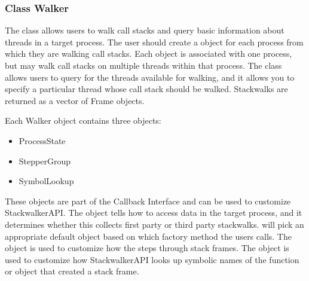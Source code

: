 \subsubsection{Class Walker}
\label{subsec:walker}

The  class allows users to walk call stacks and query basic information
about threads in a target process. The user should create a  object for
each process from which they are walking call stacks. Each  object is
associated with one process, but may walk call stacks on multiple threads within
that process. The  class allows users to query for the threads available
for walking, and it allows you to specify a particular thread whose call stack
should be walked. Stackwalks are returned as a vector of Frame objects.

Each Walker object contains three objects:
\begin{itemize}
    \item ProcessState
    \item StepperGroup
    \item SymbolLookup
\end{itemize}

These objects are part of the Callback Interface and can be used to customize
StackwalkerAPI. The  object tells  how to access data in the
target process, and it determines whether this  collects first party or
third party stackwalks.  will pick an appropriate default 
object based on which factory method the users calls. The  object is
used to customize how the  steps through stack frames. The
object is used to customize how StackwalkerAPI looks up symbolic names of the
function or object that created a stack frame.

